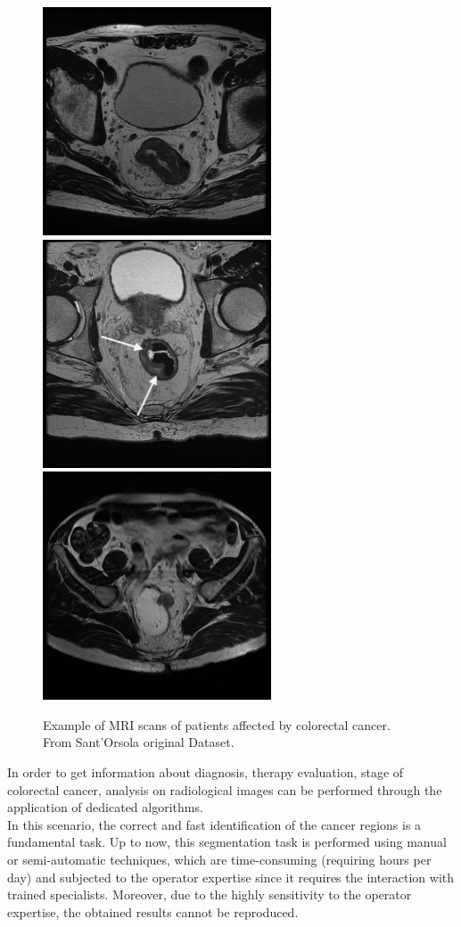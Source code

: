 \documentclass{standalone}
\begin{document}
\begin{figure}[htp]

    \centering
    \includegraphics[width=.3\textwidth]{../images/T2AX_Alta_8.png}\hfill
    \includegraphics[width=.3\textwidth]{../images/T2AX_BO11_5.png}\hfill
    \includegraphics[width=.3\textwidth]{../images/T2AX_BO1_9.png}
    
    \caption{Example of MRI scans of patients affected by colorectal cancer. From Sant'Orsola original Dataset.}
    \label{trittico}
    
    \end{figure}
In order to get information about diagnosis, therapy evaluation, stage of colorectal cancer, analysis on radiological images can be performed through the application of dedicated algorithms.\\
In this scenario, the correct and fast identification of the cancer regions is a fundamental task. 
Up to now, this segmentation task is performed using manual or semi-automatic techniques, which are time-consuming (requiring hours per day) and subjected to the operator expertise since it requires the interaction with trained specialists\cite{tesicoppola, jovana}.
Moreover, due to the highly sensitivity to the operator expertise, the  obtained results cannot be reproduced\cite{Trebeschi2017}.
\end{document}
